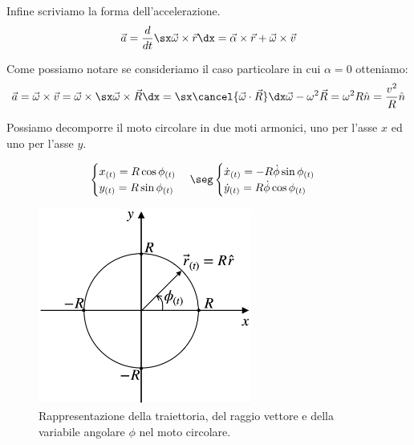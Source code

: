 Infine scriviamo la forma dell'accelerazione.
\begin{equation}
\vec a = \frac d{dt}\sx\vec\omega\times\vec r\dx = \vec \alpha\times \vec r + \vec\omega\times\vec v
\end{equation}

Come possiamo notare se consideriamo il caso particolare in cui $\alpha = 0 $ otteniamo:
\begin{equation}
\vec a = \vec \omega\times\vec v = \vec \omega\times\sx \vec\omega\times \vec R\dx = \sx\cancel{\vec\omega\cdot\vec R}\dx\vec\omega - \omega^2\vec R = \omega^2R\hat n = \frac{v^2}R\hat n
\end{equation}

Possiamo decomporre il moto circolare in due moti armonici, uno per l'asse $x$ ed uno per l'asse $y$.

\begin{equation}
\begin{cases}
x_{(t)} = R\cos\phi_{(t)}\\
y_{(t)} = R\sin\phi_{(t)}\\
\end{cases}\seg
\begin{cases}
\dot x_{(t)} = -R\dot\phi\sin\phi_{(t)}\\
\dot y_{(t)} = R\dot\phi\cos\phi_{(t)}\\
\end{cases}
\end{equation}

\begin{figure}[htbp]
\centering
\includegraphics[width=7cm]{images/circ.png}
\caption{Rappresentazione della traiettoria, del raggio vettore e della variabile angolare $\phi$ nel moto circolare.}
\label{etichetta1}
\end{figure}




